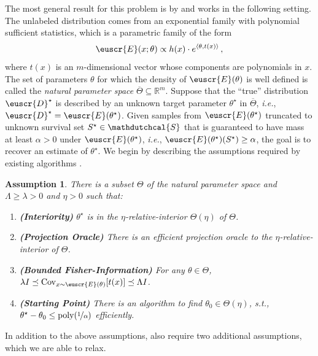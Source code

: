 \documentclass[11pt]{article}
\theoremstyle{plain}
\newtheorem{assumption}{Assumption}
\theoremstyle{definition}
\theoremstyle{remark}
\newcommand{\inangle}[1]{\left\langle#1\right\rangle}
\let\norm\relax
\newcommand{\norm}[1]{\ensuremath{\left\lVert #1 \right\rVert}}
\newcommand{\R}{\mathbb{R}}
\newcommand{\cov}{\ensuremath{\operatornamewithlimits{\rm Cov}}}
\newcommand{\nfrac}[2]{\nicefrac{#1}{#2}}
\newcommand{\poly}{\mathrm{poly}}
\newcommand{\customcal}[1]{\euscr{#1}}
\newcommand{\cD}{\customcal{D}}
\newcommand{\cE}{\customcal{E}}
\newcommand{\ie}{\textit{i.e.}}
\newcommand{\hypo}[1]{\mathdutchcal{#1}}
\newcommand{\hyS}{\hypo{S}}
\newcommand{\cDtrue}{\cD^\star}
\begin{document}
    The most general result for this problem is by \citet{lee2024unknown} and works in the following setting. The unlabeled distribution comes from an exponential family with polynomial sufficient statistics, which is a parametric family of the form
    \[ \cE(x; \theta) \propto h(x) \cdot e^{ \inangle{\theta, t(x)}}\,, \]
    where $t(x)$ is an $m$-dimensional vector whose components are polynomials in $x$.
    The set of parameters $\theta$ for which the density of $\cE(\theta)$ is well defined is called the \textit{natural parameter space} $\overline{\Theta}\subseteq\R^m$.
    Suppose that the ``true'' distribution $\cDtrue$ is described by an unknown target parameter $\theta^\star$ in $\overline{\Theta}$, \ie{}, $\cDtrue=\cE(\theta^\star)$. 
    Given samples from $\cE(\theta^\star)$ truncated to unknown survival set $S^\star \in \hyS$ that is guaranteed to have mass at least $\alpha>0$ under $\cE(\theta^\star)$, \ie{}, $\cE(\theta^\star)(S^\star)\geq \alpha$, the goal is to recover an estimate of $\theta^\star$.
    We begin by describing the assumptions required by existing algorithms \cite{lee2024unknown}. 
    \begin{assumption}\label{asmp:exponentialFamily}
        There is a subset $\Theta$ of the natural parameter space and $\Lambda\geq \lambda > 0$ and $\eta>0$ such that:
        \begin{enumerate}
            \item \textbf{(Interiority)}           
                $\theta^\star$ is in the $\eta$-relative-interior $\Theta(\eta)$ of $\Theta$.
                \label{unknowntrunc:int}
            \item \textbf{(Projection Oracle)} There is an efficient projection oracle to the $\eta$-relative-interior of $\Theta$.
            \label{unknowntrunc:proj}
            \item \textbf{(Bounded Fisher-Information)} For any $\theta\in \Theta$,
            \label{unknowntrunc:fisher}
            $\lambda I \preceq \cov_{x\sim \cE(\theta)}[t(x)]\preceq \Lambda I$.
            \item \textit{\textbf{(Starting Point)} There is an algorithm to find $\theta_0\in \Theta(\eta)$, s.t., $\norm{\theta^\star-\theta_0}\leq \poly(\nfrac{1}{\alpha})$ efficiently.}
            \label{unknowntrunc:st}
        \end{enumerate}
    \end{assumption}
    In addition to the above assumptions, \citet{lee2024unknown} also require two additional assumptions, which we are able to relax.
\end{document}
